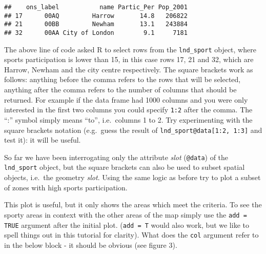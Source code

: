 \documentclass[]{article}
\newenvironment{Shaded}{}{}
\newcommand{\KeywordTok}[1]{\textcolor[rgb]{0.00,0.44,0.13}{\textbf{{#1}}}}
\newcommand{\DecValTok}[1]{\textcolor[rgb]{0.25,0.63,0.44}{{#1}}}
\newcommand{\StringTok}[1]{\textcolor[rgb]{0.25,0.44,0.63}{{#1}}}
\newcommand{\CommentTok}[1]{\textcolor[rgb]{0.38,0.63,0.69}{\textit{{#1}}}}
\newcommand{\NormalTok}[1]{{#1}}
\begin{document}
\begin{Shaded}
\end{Shaded}

\begin{verbatim}
##    ons_label           name Partic_Per Pop_2001
## 17      00AQ         Harrow       14.8   206822
## 21      00BB         Newham       13.1   243884
## 32      00AA City of London        9.1     7181
\end{verbatim}

The above line of code asked R to select rows from the
\texttt{lnd\_sport} object, where sports participation is lower than 15,
in this case rows 17, 21 and 32, which are Harrow, Newham and the city
centre respectively. The square brackets work as follows: anything
before the comma refers to the rows that will be selected, anything
after the comma refers to the number of columns that should be returned.
For example if the data frame had 1000 columns and you were only
interested in the first two columns you could specify \texttt{1:2} after
the comma. The ``:'' symbol simply means ``to'', i.e.~columns 1 to 2.
Try experimenting with the square brackets notation (e.g.~guess the
result of \texttt{lnd\_sport@data{[}1:2, 1:3{]}} and test it): it will
be useful.

So far we have been interrogating only the attribute \emph{slot}
(\texttt{@data}) of the \texttt{lnd\_sport} object, but the square
brackets can also be used to subset spatial objects, i.e.~the geometry
\emph{slot}. Using the same logic as before try to plot a subset of
zones with high sports participation.

\begin{Shaded}
\end{Shaded}

This plot is useful, but it only shows the areas which meet the
criteria. To see the sporty areas in context with the other areas of the
map simply use the \texttt{add = TRUE} argument after the initial plot.
(\texttt{add = T} would also work, but we like to spell things out in
this tutorial for clarity). What does the \texttt{col} argument refer to
in the below block - it should be obvious (see figure 3).
\end{document}
